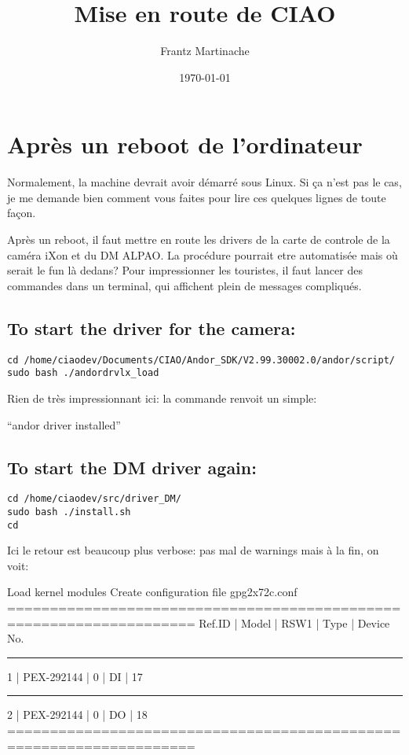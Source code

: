 \documentclass[11pt]{article}
\title{Mise en route de CIAO}
\author{Frantz Martinache}
\date{\today}
\begin{document}
\maketitle

\setcounter{tocdepth}{3}
\tableofcontents
\vspace*{1cm}

\section{Après un reboot de l'ordinateur}
\label{sec-1}


Normalement, la machine devrait avoir démarré sous Linux. Si ça n'est
pas le cas, je me demande bien comment vous faites pour lire ces
quelques lignes de toute façon.

Après un reboot, il faut mettre en route les drivers de la carte de
controle de la caméra iXon et du DM ALPAO. La procédure pourrait etre
automatisée mais où serait le fun là dedans? Pour impressionner les
touristes, il faut lancer des commandes dans un terminal, qui
affichent plein de messages compliqués.
\subsection{To start the driver for the camera:}
\label{sec-1-1}



\begin{verbatim}
cd /home/ciaodev/Documents/CIAO/Andor_SDK/V2.99.30002.0/andor/script/
sudo bash ./andordrvlx_load
\end{verbatim}

Rien de très impressionnant ici: la commande renvoit un simple:

``andor driver installed''
\subsection{To start the DM driver again:}
\label{sec-1-2}



\begin{verbatim}
cd /home/ciaodev/src/driver_DM/
sudo bash ./install.sh
cd
\end{verbatim}

Ici le retour est beaucoup plus verbose: pas mal de warnings mais à
la fin, on voit:

Load kernel modules
Create configuration file gpg2x72c.conf
====================================================================
 Ref.ID | Model                          | RSW1 |  Type | Device No.  
\hrule
      1 | PEX-292144                     |    0 |    DI |    17
\hrule
      2 | PEX-292144                     |    0 |    DO |    18
====================================================================
\end{document}
